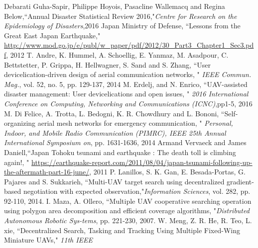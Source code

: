 \documentclass[journal]{IEEEtran}
\begin{document}
%
%
%
\begin{thebibliography}{1}
Debarati Guha-Sapir, Philippe Hoyois, Pasacline Wallemacq and Regina Below,``Annual Disaster Statistical Review 2016,"\emph{Centre for Research on
the Epidemiology of Disasters},2016 
 Japan Ministry of Defense, ``Lessons from the Great East Japan Earthquake," \url{http://www.mod.go.jp/e/publ/w_paper/pdf/2012/30_Part3_Chapter1_Sec3.pdf}, 2012
 T. Andre, K. Hummel, A. Schoellig, E. Yanmaz, M. Asadpour, C. Bettstetter, P. Grippa, H. Hellwagner, S. Sand and S. Zhang, ``User devicelication-driven design of aerial communication networks, " \emph{IEEE Commun. Mag.}, vol. 52, no. 5, pp. 129-137, 2014
 M. Erdelj, and N. Enrico, ``UAV-assisted disaster management: User devicelications and open issues, " \emph{2016 International Conference on Computing, Networking and Communications (ICNC)},pp1-5, 2016
 M. Di Felice, A. Trotta, L. Bedogni, K. R. Chowdhury and L. Bononi, ``Self-organizing aerial mesh networks for emergency communication, " \emph{Personal, Indoor, and Mobile Radio Communication (PIMRC), IEEE 25th Annual International Symposium on}, pp. 1631-1636, 2014
Armand Vervaeck and James Daniell,``Japan Tohoku tsunami and earthquake : The death toll is climbing again!, " \url{https://earthquake-report.com/2011/08/04/japan-tsunami-following-up-the-aftermath-part-16-june/}, 2011
 P. Lanillos, S. K. Gan, E. Besada-Portas, G. Pajares and S. Sukkarieh, ``Multi-UAV target search using decentralized gradient-based negotiation with expected observation,"\emph{Information Sciences}, vol. 282, pp. 92-110, 2014.
 I. Maza, A. Ollero, ``Multiple UAV cooperative searching operation
using polygon area decomposition and efficient coverage algorithms, "\emph{Distributed Autonomous Robotic Sys-tems}, pp. 221-230, 2007.
 W. Meng, Z. R. He, R. Teo, L. xie, ``Decentralized Search, Tasking and Tracking Using Multiple Fixed-Wing Miniature UAVs," \emph{11th IEEE
}
\end{thebibliography}
\end{document}
